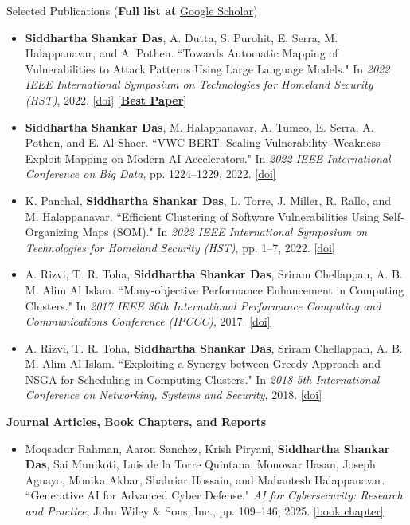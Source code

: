 \documentclass{resume} %
\begin{document}
\begin{rSection}{Selected Publications (\textbf{Full list at } \href{https://scholar.google.com/citations?user=kTAFl2yYe6QC&hl=en}{Google Scholar})}
\begin{itemize}
    \item \textbf{Siddhartha Shankar Das}, A. Dutta, S. Purohit, E. Serra, M. Halappanavar, and A. Pothen. ``Towards Automatic Mapping of Vulnerabilities to Attack Patterns Using Large Language Models." In \textit{2022 IEEE International Symposium on Technologies for Homeland Security (HST)}, 2022. \href{https://doi.org/10.1109/HST56032.2022.10025459}{[doi]} [\href{https://lh4.googleusercontent.com/RgzcFOh0gfXK4MTvMchVhGQ-X39kd13UFPGsZuHLkCcC9-CJNQ2dW_nfg0pIcuCSYbpbWlt94_z1dST95MYITwod_aW0tvTmpOLhRZqZs9eC73thuy5eA4YSDZLll9EK-w=w1280}{\textbf{Best Paper}}]

    \item \textbf{Siddhartha Shankar Das}, M. Halappanavar, A. Tumeo, E. Serra, A. Pothen, and E. Al-Shaer. ``VWC-BERT: Scaling Vulnerability--Weakness--Exploit Mapping on Modern AI Accelerators." In \textit{2022 IEEE International Conference on Big Data}, pp. 1224--1229, 2022. \href{https://doi.org/10.1109/BigData55660.2022.10020622}{[doi]}

    \item K. Panchal, \textbf{Siddhartha Shankar Das}, L. Torre, J. Miller, R. Rallo, and M. Halappanavar. ``Efficient Clustering of Software Vulnerabilities Using Self-Organizing Maps (SOM)." In \textit{2022 IEEE International Symposium on Technologies for Homeland Security (HST)}, pp. 1--7, 2022. \href{https://doi.org/10.1109/HST56032.2022.10025443}{[doi]}

    \item A. Rizvi, T. R. Toha, \textbf{Siddhartha Shankar Das}, Sriram Chellappan, A. B. M. Alim Al Islam. ``Many-objective Performance Enhancement in Computing Clusters." In \textit{2017 IEEE 36th International Performance Computing and Communications Conference (IPCCC)}, 2017. \href{https://doi.org/10.1109/PCCC.2017.8280491}{[doi]}

    \item A. Rizvi, T. R. Toha, \textbf{Siddhartha Shankar Das}, Sriram Chellappan, A. B. M. Alim Al Islam. ``Exploiting a Synergy between Greedy Approach and NSGA for Scheduling in Computing Clusters." In \textit{2018 5th International Conference on Networking, Systems and Security}, 2018. \href{https://doi.org/10.1109/NSysS.2018.8631376}{[doi]}
\end{itemize}

\textbf{Journal Articles, Book Chapters, and Reports}
\begin{itemize}
    \item Moqsadur Rahman, Aaron Sanchez, Krish Piryani, \textbf{Siddhartha Shankar Das}, Sai Munikoti, Luis de la Torre Quintana, Monowar Hasan, Joseph Aguayo, Monika Akbar, Shahriar Hossain, and Mahantesh Halappanavar. ``Generative AI for Advanced Cyber Defense." \textit{AI for Cybersecurity: Research and Practice}, John Wiley \& Sons, Inc., pp. 109--146, 2025. \href{https://onlinelibrary.wiley.com/doi/abs/10.1002/9781394293773.ch04}{[book chapter]}


\end{itemize}
\end{rSection}
\end{document}
